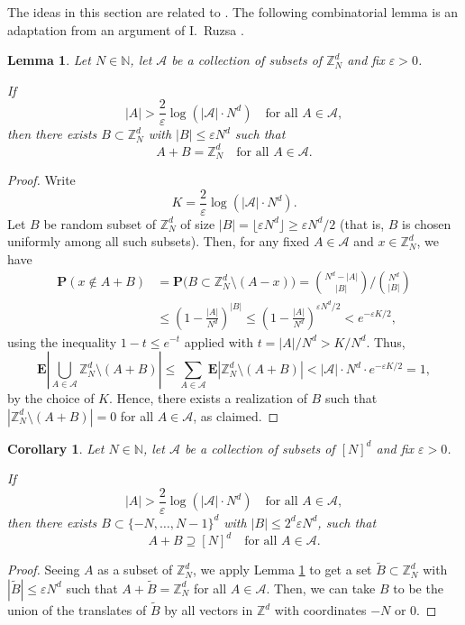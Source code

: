 \documentclass[12pt]{amsart}
\newcommand{\e}{\varepsilon}
\newtheorem{corollary}[theorem]{Corollary}
\newtheorem{lemma}[theorem]{Lemma}
\def\Z{{\mathbb{Z}}}
\numberwithin{theorem}{section}
\numberwithin{equation}{section}
\begin{document}
  The ideas in this section are related to \cite[Section 3]{KeletiMathe22}. The following combinatorial lemma is an adaptation from an argument of I.~Ruzsa \cite[Lemma 5.2]{Ruzsa16}.
\begin{lemma} \label{lem:sum-combinatorial}
    Let $N\in\mathbb{N}$, let $\mathcal{A}$ be a collection of subsets of $\Z_N^d$ and fix $\e>0$.

    If
    \[
        |A|> \frac{2}{\e}\log\left(|\mathcal{A}|\cdot N^d\right) \quad\text{for all }A\in\mathcal{A},
    \]
    then there exists $B\subset \Z_N^d$ with $|B|\le \e N^d$ such that
    \[
        A+B = \Z_N^d \quad\text{for all } A\in\mathcal{A}.
    \]
\end{lemma}
\begin{proof}
    Write
    \[
        K = \frac{2}{\e}\log\left(|\mathcal{A}|\cdot N^d\right) .
    \]
    Let $B$ be random subset of $\mathbb{Z}_N^d$ of size $|B|=\lfloor \e N^d \rfloor\ge \e N^d/2$ (that is, $B$ is chosen uniformly among all such subsets). Then, for any fixed $A\in\mathcal{A}$ and $x\in \mathbb{Z}_N^d$, we have
    \begin{align*}
        \mathbf{P}(x \notin  A+B) &= \mathbf{P}\bigl(B\subset \mathbb{Z}_N^d\setminus (A-x)\bigr)  = {N^d-|A|\choose |B|}/{N^d\choose |B|} \\
        &\le \left(1-\frac{|A|}{N^d}\right)^{|B|} \le \left(1-\frac{|A|}{N^d}\right)^{\e N^d/2} < e^{-\e K/2},
    \end{align*}
    using the inequality $1-t\le e^{-t}$ applied with $t=|A|/N^d>K/N^d$. Thus,
    \[
        \mathbf{E}\left|\bigcup_{A\in\mathcal{A}}\mathbb{Z}_N^d\setminus (A+B) \right| \le \sum_{A\in\mathcal{A}} \mathbf{E}|\mathbb{Z}_N^d\setminus (A+B)| < |\mathcal{A}|\cdot N^d\cdot e^{-\e K/2} = 1,
    \]
    by the choice of $K$. Hence, there exists a realization of $B$ such that $|\Z_N^d\setminus (A+B)|=0$ for all $A\in\mathcal{A}$, as claimed.
\end{proof}

\begin{corollary}  \label{cor:sum-combinatorial}
    Let $N\in\mathbb{N}$, let $\mathcal{A}$ be a collection of subsets of $[N]^d$ and fix $\e>0$.

    If
    \[
        |A|> \frac{2}{\e}\log\left(|\mathcal{A}|\cdot N^d\right) \quad\text{for all }A\in\mathcal{A},
    \]
    then there exists $B\subset \{ -N,\ldots, N-1\}^d$ with $|B|\le 2^d \e N^d$, such that
    \[
        A+B \supseteq [N]^d \quad\text{for all } A\in\mathcal{A}.
    \]
\end{corollary}
\begin{proof}
    Seeing $A$ as a subset of $\Z_N^d$, we apply Lemma \ref{lem:sum-combinatorial} to get a set $\tilde{B}\subset \Z_N^d$ with $|\tilde{B}|\le \e N^d$ such that $A+\tilde{B}=\Z_N^d$ for all $A\in\mathcal{A}$. Then, we can take $B$ to be the union of the translates of $\tilde{B}$ by all vectors in $\Z^d$ with coordinates $-N$ or $0$.
\end{proof}
\end{document}
